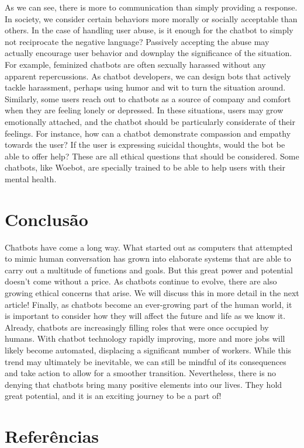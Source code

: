 \documentclass[
	12pt,				%
	oneside,   	        %
	a4paper,			%
	english,			%
	french,				%
	spanish,			%
	brazil,				%
	]{pacotes/abntex2}
\begin{document}
As we can see, there is more to communication than simply providing a response. In society, we consider certain behaviors more morally or socially acceptable than others. In the case of handling user abuse, is it enough for the chatbot to simply not reciprocate the negative language? Passively accepting the abuse may actually encourage user behavior and downplay the significance of the situation. For example, feminized chatbots are often sexually harassed without any apparent repercussions. As chatbot developers, we can design bots that actively tackle harassment, perhaps using humor and wit to turn the situation around. 
Similarly, some users reach out to chatbots as a source of company and comfort when they are feeling lonely or depressed. In these situations, users may grow emotionally attached, and the chatbot should be particularly considerate of their feelings. For instance, how can a chatbot demonstrate compassion and empathy towards the user? If the user is expressing suicidal thoughts, would the bot be able to offer help? These are all ethical questions that should be considered. Some chatbots, like Woebot, are specially trained to be able to help users with their mental health.


\section{Conclusão}
Chatbots have come a long way. What started out as computers that attempted to mimic human conversation has grown into elaborate systems that are able to carry out a multitude of functions and goals. But this great power and potential doesn’t come without a price. As chatbots continue to evolve, there are also growing ethical concerns that arise. We will discuss this in more detail in the next article!
Finally, as chatbots become an ever-growing part of the human world, it is important to consider how they will affect the future and life as we know it. Already, chatbots are increasingly filling roles that were once occupied by humans. With chatbot technology rapidly improving, more and more jobs will likely become automated, displacing a significant number of workers. While this trend may ultimately be inevitable, we can still be mindful of its consequences and take action to allow for a smoother transition. 
Nevertheless, there is no denying that chatbots bring many positive elements into our lives. They hold great potential, and it is an exciting journey to be a part of!
\section{Referências}
\end{document}
